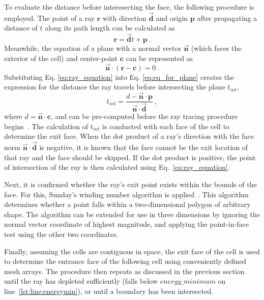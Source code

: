 To evaluate the distance before interesecting the face, the following procedure is employed. The point of a ray $\textbf{r}$ with direction $\Vec{\textbf{d}}$ and origin $\textbf{p}$ after propagating a distance of $t$ along its path length can be calculated as
\begin{equation}
    \textbf{r} = \Vec{\textbf{d}}t + \textbf{p}~.
    \label{eq:ray_equation}
\end{equation}
Meanwhile, the equation of a plane with a normal vector $\Vec{\textbf{n}}$ (which faces the exterior of the cell) and center-point $\textbf{c}$ can be represented as
\begin{equation}
    \Vec{\textbf{n}} \cdot (\textbf{r} - \textbf{c}) = 0~.
    \label{eq:eq_for_plane}
\end{equation}
Substituting Eq. \ref{eq:ray_equation} into Eq. \ref{eq:eq_for_plane} creates the expression for the distance the ray travels before intersecting the plane $t_{int}$,
\begin{equation}
    t_{int}=\frac{d-\Vec{\textbf{n}}\cdot\textbf{p}}{\Vec{\textbf{n}}\cdot\Vec{\textbf{d}}}~,
    \label{eq:eq_for_t}
\end{equation}
where $d=\Vec{\textbf{n}}\cdot\textbf{c}$, and can be pre-computed before the ray tracing procedure begins~\cite{Kay1986RayScenes}. The calculation of $t_{int}$ is conducted with each face of the cell to determine the exit face. When the dot product of a ray's direction with the face norm $\Vec{\textbf{n}}\cdot{}\Vec{\textbf{d}}$ is negative, it is known that the face cannot be the exit location of that ray and the face should be skipped. If the dot product is positive, the point of intersection of the ray is then calculated using Eq.~\ref{eq:ray_equation}.


Next, it is confirmed whether the ray's exit point exists within the bounds of the face. For this, Sunday's winding number algorithm is applied~\cite{Sunday2021PracticalCode}. This algorithm determines whether a point falls within a two-dimensional polygon of arbitrary shape. The algorithm can be extended for use in three dimensions by ignoring the normal vector coordinate of highest magnitude, and applying the point-in-face test using the other two coordinates.


Finally, assuming the cells are contiguous in space, the exit face of the cell is used to determine the entrance face of the following cell using conveniently defined mesh arrays.
The procedure then repeats as discussed in the previous section until the ray has depleted sufficiently (falls below $energy\_minimum$ on line~\ref{lst:line:energymin}), or until a boundary has been intersected.

